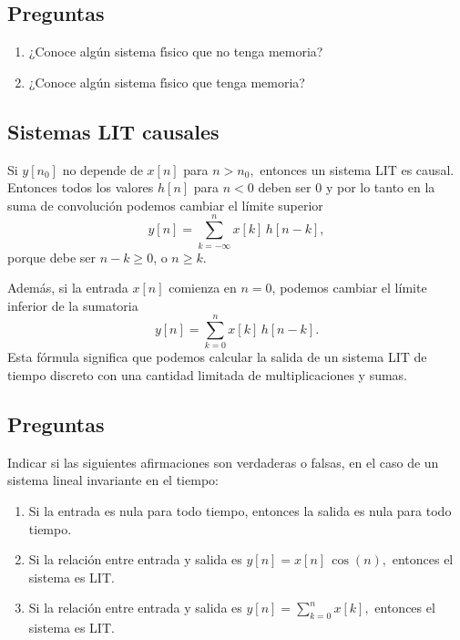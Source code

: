 \subsection{Preguntas}

\begin{enumerate}
\item ¿Conoce alg\'{u}n sistema f\'{\i}sico que no tenga memoria?
\item ¿Conoce alg\'{u}n sistema f\'{\i}sico que tenga memoria?
\end{enumerate}

\subsection{Sistemas LIT causales}

Si $y\left[n_{0}\right] $ no depende de $x\left[ n\right] $ para $n>n_{0},$ entonces un sistema LIT es causal. 
Entonces todos los valores $h\left[n\right]$  para $n<0$ deben ser $0$ y por lo tanto en
la suma de convoluci\'{o}n podemos cambiar el límite superior 
\begin{equation}
y\left[n\right] =\sum_{k=-\infty}^{n}x\left[k\right] \, h\left[ n-k\right],
\end{equation}
porque debe ser $n - k \geq 0$, o $n \geq k$.

Además, si la entrada $x[n]$ comienza en $n = 0$, podemos cambiar el límite inferior de la sumatoria
\begin{equation}
	y\left[n\right] =\sum_{k=0}^{n}x\left[k\right] \, h\left[ n-k\right].
\end{equation}
Esta fórmula significa que podemos calcular la salida de un sistema LIT de tiempo discreto con una cantidad limitada de multiplicaciones y sumas.


\subsection{Preguntas}

Indicar si las siguientes afirmaciones son verdaderas o falsas, en el caso de un sistema lineal invariante en el tiempo:

\begin{enumerate}
\item  Si la entrada es nula para todo tiempo, entonces la salida es nula para todo tiempo.

\item  Si la relaci\'{o}n entre entrada y salida es 
$y[n] =x[n] \, \cos \left(n\right) ,$ entonces el sistema  es LIT.

\item  Si la relaci\'{o}n entre entrada y salida es 
$y[n] =\sum_{k=0}^{n} x[k] ,$ entonces el sistema es LIT. 
\end{enumerate}

